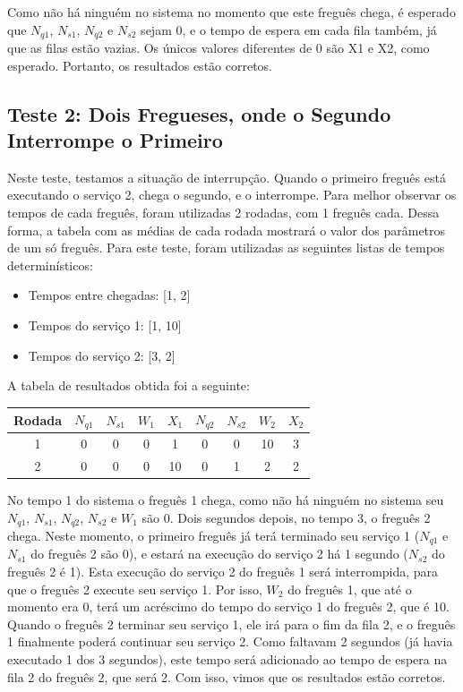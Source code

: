 \documentclass[a4paper,12pt]{report}
\begin{document}
Como não há ninguém no sistema no momento que este freguês chega, é esperado que $N_{q1}$, $N_{s1}$, $N_{q2}$ e $N_{s2}$ sejam 0, e o tempo de espera em cada fila também, já que as filas estão vazias. Os únicos valores diferentes de 0 são X1 e X2, como esperado. Portanto, os resultados estão corretos.


\subsection{Teste 2: Dois Fregueses, onde o Segundo Interrompe o Primeiro}
Neste teste, testamos a situação de interrupção. Quando o primeiro freguês está executando o serviço 2, chega o segundo, e o interrompe. Para melhor observar os tempos de cada freguês, foram utilizadas 2 rodadas, com 1 freguês cada. Dessa forma, a tabela com as médias de cada rodada mostrará o valor dos parâmetros de um só freguês. Para este teste, foram utilizadas as seguintes listas de tempos determinísticos:

\vspace{-1.5em}
\begin{itemize}
	\itemsep0pt
	\item Tempos entre chegadas: [1, 2]
    \item Tempos do serviço 1: [1, 10]
    \item Tempos do serviço 2: [3, 2]
\end{itemize}

A tabela de resultados obtida foi a seguinte:
\vspace{-1em}
\begin{center}
\begin{tabular}{ c c c c c c c c c }
  \hline
  \textbf{Rodada} & $N_{q1}$ & $N_{s1}$ & $W_1$ & $X_1$ & $N_{q2}$ & $N_{s2}$ & $W_2$ & $X_2$ \\
  \hline
  1 & 0 & 0 & 0 & 1 & 0 & 0 & 10 & 3 \\
  2 & 0 & 0 & 0 & 10 & 0 & 1 & 2 & 2 \\
  \hline
\end{tabular}
\end{center}

No tempo 1 do sistema o freguês 1 chega, como não há ninguém no sistema seu $N_{q1}$, $N_{s1}$, $N_{q2}$, $N_{s2}$ e $W_1$ são 0. Dois segundos depois, no tempo 3, o freguês 2 chega. Neste momento, o primeiro freguês já terá terminado seu serviço 1 ($N_{q1}$ e $N_{s1}$ do freguês 2 são 0), e estará na execução do serviço 2 há 1 segundo ($N_{s2}$ do freguês 2 é 1). Esta execução do serviço 2 do freguês 1 será interrompida, para que o freguês 2 execute seu serviço 1. Por isso, $W_2$ do freguês 1, que até o momento era 0, terá um acréscimo do tempo do serviço 1 do freguês 2, que é 10. Quando o freguês 2 terminar seu serviço 1, ele irá para o fim da fila 2, e o freguês 1 finalmente poderá continuar seu serviço 2. Como faltavam 2 segundos (já havia executado 1 dos 3 segundos), este tempo será adicionado ao tempo de espera na fila 2 do freguês 2, que será 2. Com isso, vimos que os resultados estão corretos.
\end{document}
